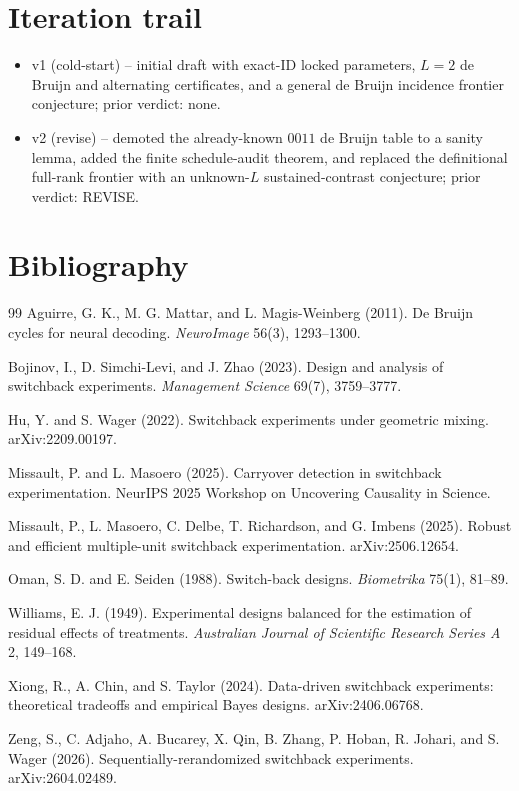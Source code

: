 \documentclass[11pt]{article}
\theoremstyle{definition}
\theoremstyle{plain}
\theoremstyle{remark}
\begin{document}
\section{Iteration trail}
\begin{itemize}[leftmargin=2em]
\item v1 (cold-start) -- initial draft with exact-ID locked parameters, \(L=2\) de Bruijn and alternating certificates, and a general de Bruijn incidence frontier conjecture; prior verdict: none.
\item v2 (revise) -- demoted the already-known \(0011\) de Bruijn table to a sanity lemma, added the finite schedule-audit theorem, and replaced the definitional full-rank frontier with an unknown-\(L\) sustained-contrast conjecture; prior verdict: REVISE.
\end{itemize}

\section*{Bibliography}
\begin{thebibliography}{99}
Aguirre, G. K., M. G. Mattar, and L. Magis-Weinberg (2011).
De Bruijn cycles for neural decoding.
\textit{NeuroImage} 56(3), 1293--1300.

Bojinov, I., D. Simchi-Levi, and J. Zhao (2023).
Design and analysis of switchback experiments.
\textit{Management Science} 69(7), 3759--3777.

Hu, Y. and S. Wager (2022).
Switchback experiments under geometric mixing.
arXiv:2209.00197.

Missault, P. and L. Masoero (2025).
Carryover detection in switchback experimentation.
NeurIPS 2025 Workshop on Uncovering Causality in Science.

Missault, P., L. Masoero, C. Delbe, T. Richardson, and G. Imbens (2025).
Robust and efficient multiple-unit switchback experimentation.
arXiv:2506.12654.

Oman, S. D. and E. Seiden (1988).
Switch-back designs.
\textit{Biometrika} 75(1), 81--89.

Williams, E. J. (1949).
Experimental designs balanced for the estimation of residual effects of treatments.
\textit{Australian Journal of Scientific Research Series A} 2, 149--168.

Xiong, R., A. Chin, and S. Taylor (2024).
Data-driven switchback experiments: theoretical tradeoffs and empirical Bayes designs.
arXiv:2406.06768.

Zeng, S., C. Adjaho, A. Bucarey, X. Qin, B. Zhang, P. Hoban, R. Johari, and S. Wager (2026).
Sequentially-rerandomized switchback experiments.
arXiv:2604.02489.
\end{thebibliography}
\end{document}
